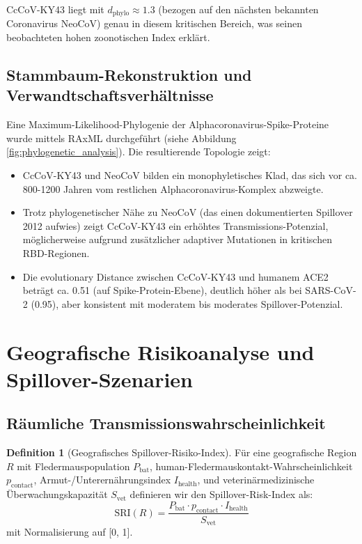 \documentclass[11pt,a4paper]{article}
\theoremstyle{definition}
\newtheorem{definition}[theorem]{Definition}
\begin{document}
CcCoV-KY43 liegt mit $d_{\text{phylo}} \approx 1.3$ (bezogen auf den nächsten bekannten Coronavirus NeoCoV) genau in diesem kritischen Bereich, was seinen beobachteten hohen zoonotischen Index erklärt.

\subsection{Stammbaum-Rekonstruktion und Verwandtschaftsverhältnisse}

Eine Maximum-Likelihood-Phylogenie der Alphacoronavirus-Spike-Proteine wurde mittels RAxML durchgeführt (siehe Abbildung \ref{fig:phylogenetic_analysis}). Die resultierende Topologie zeigt:

\begin{itemize}
\item CcCoV-KY43 und NeoCoV bilden ein monophy­leti­sches Klad, das sich vor ca. 800-1200 Jahren vom restlichen Alphacoronavirus-Komplex abzweigte.
\item Trotz phylogenetischer Nähe zu NeoCoV (das einen dokumentierten Spillover 2012 aufwies) zeigt CcCoV-KY43 ein erhöhtes Transmissions-Potenzial, möglicherweise aufgrund zusätzlicher adaptiver Mutationen in kritischen RBD-Regionen.
\item Die evolutionary Distance zwischen CcCoV-KY43 und humanem ACE2 beträgt ca. 0.51 (auf Spike-Protein-Ebene), deutlich höher als bei SARS-CoV-2 (0.95), aber konsistent mit moderatem bis moderates Spillover-Potenzial.
\end{itemize}

\section{Geografische Risikoanalyse und Spillover-Szenarien}

\subsection{Räumliche Transmissionswahrscheinlichkeit}

\begin{definition}[Geografisches Spillover-Risiko-Index]
Für eine geografische Region $R$ mit Fledermauspopulation $P_{\text{bat}}$, human-Fledermauskontakt-Wahrscheinlichkeit $p_{\text{contact}}$, Armut-/Unterer\-nährungsindex $I_{\text{health}}$, und veterinär­medizinische Überwachungskapazität $S_{\text{vet}}$ definieren wir den Spillover-Risk-Index als:
\[
\text{SRI}(R) = \frac{P_{\text{bat}} \cdot p_{\text{contact}} \cdot I_{\text{health}}}{S_{\text{vet}}}
\]
mit Normalisierung auf [0, 1].
\end{definition}
\end{document}
